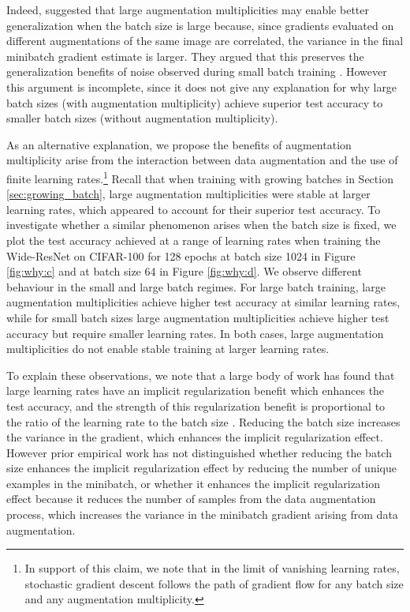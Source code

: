 \documentclass{article}
\begin{document}
Indeed, \citet{hoffer2019augment} suggested that large augmentation multiplicities may enable better generalization when the batch size is large because, since gradients evaluated on different augmentations of the same image are correlated, the variance in the final minibatch gradient estimate is larger. They argued that this preserves the generalization benefits of noise observed during small batch training \citep{keskar2016large}. However this argument is incomplete, since it does not give any explanation for why large batch sizes (with augmentation multiplicity) achieve superior test accuracy to smaller batch sizes (without augmentation multiplicity). 

As an alternative explanation, we propose the benefits of augmentation multiplicity arise from the interaction between data augmentation and the use of finite learning rates.\footnote{In support of this claim, we note that in the limit of vanishing learning rates, stochastic gradient descent follows the path of gradient flow for any batch size and any augmentation multiplicity.} Recall that when training with growing batches in Section \ref{sec:growing_batch}, large augmentation multiplicities were stable at larger learning rates, which appeared to account for their superior test accuracy. To investigate whether a similar phenomenon arises when the batch size is fixed, we plot the test accuracy achieved at a range of learning rates when training the Wide-ResNet on CIFAR-100 for 128 epochs at batch size 1024 in Figure \ref{fig:why:c} and at batch size 64 in Figure \ref{fig:why:d}. We observe different behaviour in the small and large batch regimes. For large batch training, large augmentation multiplicities achieve higher test accuracy at similar learning rates, while for small batch sizes large augmentation multiplicities achieve higher test accuracy but require smaller learning rates. In both cases, large augmentation multiplicities do not enable stable training at larger learning rates.


To explain these observations, we note that a large body of work has found that large learning rates have an implicit regularization benefit which enhances the test accuracy, and the strength of this regularization benefit is proportional to the ratio of the learning rate to the batch size \citep{jastrzkebski2017three,li2019towards, smith2021origin}. Reducing the batch size increases the variance in the gradient, which enhances the implicit regularization effect. However prior empirical work has not distinguished whether reducing the batch size enhances the implicit regularization effect by reducing the number of unique examples in the minibatch, or whether it enhances the implicit regularization effect because it reduces the number of samples from the data augmentation process, which increases the variance in the minibatch gradient arising from data augmentation. 
\end{document}
